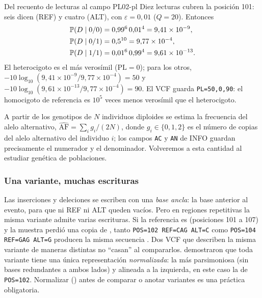 \begin{ejemplo}{Del recuento de lecturas al campo PL}{02-pl}
Diez lecturas cubren la posición 101: seis dicen  (REF) y cuatro  (ALT), con $\varepsilon = 0{,}01$ ($Q=20$). Entonces
\begin{align*}
\mathbb{P}(D\mid 0/0) &= 0{,}99^{6}\,0{,}01^{4} = 9{,}41\times10^{-9},\\
\mathbb{P}(D\mid 0/1) &= 0{,}5^{10} = 9{,}77\times10^{-4},\\
\mathbb{P}(D\mid 1/1) &= 0{,}01^{6}\,0{,}99^{4} = 9{,}61\times10^{-13}.
\end{align*}
El heterocigoto es el más verosímil ($\mathrm{PL}=0$); para los otros, $-10\log_{10}(9{,}41\times10^{-9}/9{,}77\times10^{-4}) = 50$ y $-10\log_{10}(9{,}61\times10^{-13}/9{,}77\times10^{-4})=90$. El VCF guarda \texttt{PL=50,0,90}: el homocigoto de referencia es $10^{5}$ veces menos verosímil que el heterocigoto.
\end{ejemplo}

A partir de los genotipos de $N$ individuos diploides se estima la frecuencia del alelo alternativo, $\widehat{\mathrm{AF}} = \sum_i g_i/(2N)$, donde $g_i\in\{0,1,2\}$ es el número de copias del alelo alternativo del individuo $i$; los campos \texttt{AC} y \texttt{AN} de INFO guardan precisamente el numerador y el denominador. Volveremos a esta cantidad al estudiar genética de poblaciones.

\subsubsection{Una variante, muchas escrituras}

Las inserciones y deleciones se escriben con una \emph{base ancla}: la base anterior al evento, para que ni REF ni ALT queden vacíos. Pero en regiones repetitivas la misma variante admite varias escrituras. Si la referencia es  (posiciones 101 a 107) y la muestra perdió una copia de , tanto \texttt{POS=102 REF=CAG ALT=C} como \texttt{POS=104 REF=GAG ALT=G} producen la misma secuencia . Dos VCF que describen la misma variante de maneras distintas no ``casan'' al compararlos. \textcite{c02-tan2015} demostraron que toda variante tiene una única representación \emph{normalizada}: la más parsimoniosa (sin bases redundantes a ambos lados) y alineada a la izquierda, en este caso la de \texttt{POS=102}. Normalizar () antes de comparar o anotar variantes es una práctica obligatoria.




